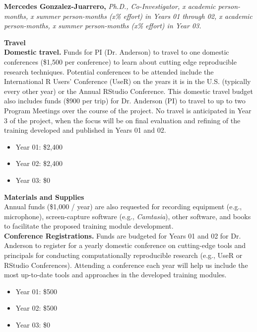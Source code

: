 \documentclass[pdftex,english,12pt,parskip=half]{scrartcl}
\begin{document}
\noindent \textbf{Mercedes Gonzalez-Juarrero,} \textit{Ph.D., Co-Investigator, x academic person-months, x summer person-months (x\% effort) in Years 01 through 02, x academic person-months, x summer person-months (x\% effort) in Year 03.}

{\large \textbf{Travel}} \\

\noindent \textbf{Domestic travel.} Funds for PI (Dr. Anderson) to travel to one domestic conferences (\$1,500 per conference) to learn about cutting edge reproducible research techniques. Potential conferences to be attended include the International R Users' Conference (UseR) on the years it is in the U.S. (typically every other year) or the Annual RStudio Conference. This domestic travel budget also includes funds (\$900 per trip) for Dr. Anderson (PI) to travel to up to two Program Meetings over the course of the project. No travel is anticipated in Year 3 of the project, when the focus will be on final evaluation and refining of the training developed and published in Years 01 and 02.
\begin{itemize}
\item Year 01: \$2,400
\item Year 02: \$2,400
\item Year 03: \$0
\end{itemize}

{\large \textbf{Materials and Supplies}} \\ Annual funds (\$1,000 / year) are also  requested for recording equipment (e.g., microphone), screen-capture software (e.g., \textit{Camtasia}), other software, and books to facilitate the proposed training module development. \\

\noindent \textbf{Conference Registrations.} Funds are budgeted for Years 01 and 02 for Dr. Anderson to register for a yearly domestic conference on cutting-edge tools and principals for conducting computationally reproducible research (e.g., UseR or RStudio Conferences). Attending a conference each year will help us include the most up-to-date tools and approaches in the developed training modules.
\begin{itemize}
\item Year 01: \$500
\item Year 02: \$500
\item Year 03: \$0
\end{itemize}
\end{document}

